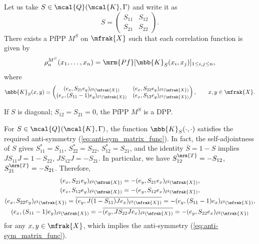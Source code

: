 \begin{Proposition}\label{prop:existence_ppp}
Let us take $S\in\mcal{Q}(\mcal{K},\Gamma)$ and write it as
\begin{equation*}
	S=\left(
	\begin{matrix}
		S_{11} & S_{12} \\
		S_{21} & S_{22}
	\end{matrix}
	\right).
\end{equation*}
There exists a PfPP $M^{S}$ on $\mfrak{X}$ such that each correlation function is given by
\begin{equation*}
	\rho^{M^{S}}_{n}(x_{1},\dots, x_{n})=\mrm{Pf} [\mbb{K}_{S}(x_{i},x_{j}) ]_{1\le i,j\le n},
\end{equation*}
where
\begin{equation}
\label{eq:matrix_kernel_S}
	\mbb{K}_{S}(x,y)=\left(
	\begin{matrix}
		(e_{x},S_{21}e_{y})_{\ell^{2}(\mfrak{X})} & (e_{x},S_{22}e_{y})_{\ell^{2}(\mfrak{X})} \\
		(e_{x},(S_{11}-1)e_{y})_{\ell^{2}(\mfrak{X})} & (e_{x},S_{12}e_{y})_{\ell^{2}(\mfrak{X})}
	\end{matrix}
	\right),\qquad x,y\in\mfrak{X}.
\end{equation}
\end{Proposition}

\begin{Remark}
If $S$ is diagonal; $S_{12}=S_{21}=0$, the PfPP $M^{S}$ is a DPP.
\end{Remark}

\begin{Remark}
\label{rem:check_anti-sym_matrix_func}
For $S\in\mcal{Q}(\mcal{K},\Gamma)$, the function $\mbb{K}_{S}(\cdot,\cdot)$ satisfies the required anti-symmetry (\ref{eq:anti-sym_matrix_func}). In fact, the self-adjointness of $S$ gives $S_{11}^{\ast}=S_{11}$, $S_{22}^{\ast}=S_{22}$, $S_{12}^{\ast}=S_{21}$, and the identity $\overline{S}=1-S$ implies $JS_{11}J=1-S_{22}$, $JS_{12}J=-S_{21}$. In particular, we have $S_{12}^{\mrm{T}}=-S_{12}$, $S_{21}^{\mrm{T}}=-S_{21}$. Therefore,
\begin{gather*}
	(e_{x},S_{21}e_{y})_{\ell^{2}(\mfrak{X})} =-(e_{y},S_{21}e_{x})_{\ell^{2}(\mfrak{X})},\\
	(e_{x},S_{12}e_{y})_{\ell^{2}(\mfrak{X})} =-(e_{y},S_{12}e_{x})_{\ell^{2}(\mfrak{X})}, \\
	(e_{x},S_{22}e_{y})_{\ell^{2}(\mfrak{X})} =\overline{(e_{y},J(1-S_{11})Je_{x})_{\ell^{2}(\mfrak{X})}}=-(e_{y},(S_{11}-1)e_{x})_{\ell^{2}(\mfrak{X})}, \\
(e_{x},(S_{11}-1)e_{y})_{\ell^{2}(\mfrak{X})}=-\overline{(e_{y},JS_{22}Je_{x})_{\ell^{2}(\mfrak{X})}}=-(e_{y},S_{22}e_{x})_{\ell^{2}(\mfrak{X})}
\end{gather*}
for any $x,y\in\mfrak{X}$, which implies the anti-symmetry (\ref{eq:anti-sym_matrix_func}).
\end{Remark}
